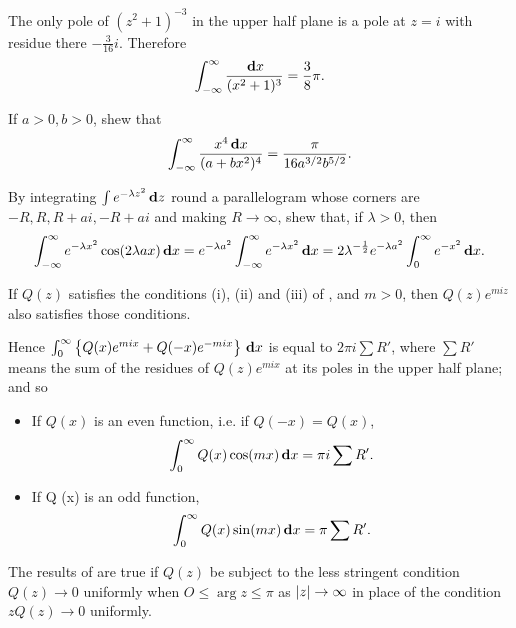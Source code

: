 \begin{wandwexample}
  The only pole of $(z^{2} + 1)^{-3}$ in the upper half plane is a
  pole at $z=i$ with residue there $-\frac{3}{16} i$. Therefore
  $$
  \int_{-\infty}^{\infty} \frac{\, \mathbf{d} x}{ (x^{2}+1)^{3} }
  =
  \frac{3}{8} \pi.
  $$
\end{wandwexample}
\begin{wandwexample}
If $a > 0, b > 0$, shew that
$$
\int_{-\infty}^{\infty}
\frac{x^{4} \, \mathbf{d} x}{ (a + bx^{2})^{4} }
=
\frac{\pi}{ 16 a^{3/2} b^{5/2}}.
$$
\end{wandwexample}
\begin{wandwexample}
  By integrating $\int e^{-\lambda z^{2}} \, \mathbf{d} z$ round a
parallelogram whose corners are $-R, R, R + ai, -R + ai$ and making $R
\rightarrow \infty$, shew that, if $\lambda > 0$, then
  $$
  \int_{-\infty}^{\infty} e^{-\lambda x^{2}} \cos (2\lambda a x)
\, \mathbf{d} x = e^{-\lambda a^{2}} \int_{-\infty}^{\infty} e^{-\lambda
x^{2}} \, \mathbf{d} x = 2 \lambda^{-\frac{1}{2}} e^{-\lambda a^{2}}
\int_{0}^{\infty} e^{-x^{2}} \, \mathbf{d} x.
  $$
\end{wandwexample}
If $Q(z)$ satisfies the conditions (i), (ii) and (iii) of
, and $m > 0$,
then $Q(z) e^{miz}$ also satisfies those conditions.

%
%

Hence
$
\int_{0}^{\infty}
\left\{ 
  Q(x) e^{mix} + Q(-x) e^{-mix}
 \right\}
\, \mathbf{d} x
$
is equal to $2\pi i \sum R'$, where
$\sum R'$ means the sum of the residues of $Q(z) e^{mix}$ at its poles
in the upper half plane; and so
\begin{itemize}
\item %
  If $Q(x)$ is an even function, i.e. if $Q (- x) = Q (x)$,
  $$
  \int_{0}^{\infty} Q(x) \cos(mx) \, \mathbf{d} x
  =
  \pi i \sum R'.
  $$
\item %
  If Q (x) is an odd function,
  $$
  \int_{0}^{\infty} Q(x) \sin(mx) \, \mathbf{d} x
  =
  \pi \sum R'.
  $$
\end{itemize}

The results of  are true if $Q(z)$ be
subject to the less stringent condition $Q(z) \rightarrow 0$ uniformly
when
$O \leq \arg z \leq \pi$ as $\left| z \right| \rightarrow \infty$ in
place of the condition $z Q(z) \rightarrow 0$ uniformly.

